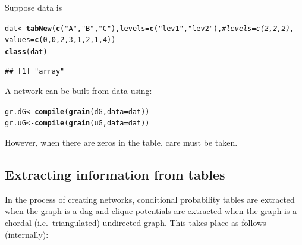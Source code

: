 \documentclass[10pt]{article}\usepackage[]{graphicx}\usepackage[]{xcolor}
\makeatletter
\newcommand{\hlnum}[1]{\textcolor[rgb]{0.686,0.059,0.569}{#1}}%
\newcommand{\hlstr}[1]{\textcolor[rgb]{0.192,0.494,0.8}{#1}}%
\newcommand{\hlcom}[1]{\textcolor[rgb]{0.678,0.584,0.686}{\textit{#1}}}%
\newcommand{\hlstd}[1]{\textcolor[rgb]{0.345,0.345,0.345}{#1}}%
\newcommand{\hlkwb}[1]{\textcolor[rgb]{0.69,0.353,0.396}{#1}}%
\newcommand{\hlkwc}[1]{\textcolor[rgb]{0.333,0.667,0.333}{#1}}%
\newcommand{\hlkwd}[1]{\textcolor[rgb]{0.737,0.353,0.396}{\textbf{#1}}}%
\newenvironment{kframe}{%
 \def\at@end@of@kframe{}%
 \ifinner\ifhmode%
  \def\at@end@of@kframe{\end{minipage}}%
  \begin{minipage}{\columnwidth}%
 \fi\fi%
 \def\FrameCommand##1{\hskip\@totalleftmargin \hskip-\fboxsep
 \colorbox{shadecolor}{##1}\hskip-\fboxsep
     \hskip-\linewidth \hskip-\@totalleftmargin \hskip\columnwidth}%
 \MakeFramed {\advance\hsize-\width
   \@totalleftmargin\z@ \linewidth\hsize
   \@setminipage}}%
 {\par\unskip\endMakeFramed%
 \at@end@of@kframe}
\newenvironment{knitrout}{}{} %
\makeatother
\begin{document}
Suppose data is
\begin{knitrout}
\color{fgcolor}\begin{kframe}
\begin{alltt}
\hlstd{dat} \hlkwb{<-} \hlkwd{tabNew}\hlstd{(}\hlkwd{c}\hlstd{(}\hlstr{"A"}\hlstd{,} \hlstr{"B"}\hlstd{,} \hlstr{"C"}\hlstd{),} \hlkwc{levels}\hlstd{=}\hlkwd{c}\hlstd{(}\hlstr{"lev1"}\hlstd{,} \hlstr{"lev2"}\hlstd{),} \hlcom{#levels=c(2,2,2),}
              \hlkwc{values}\hlstd{=}\hlkwd{c}\hlstd{(}\hlnum{0}\hlstd{,} \hlnum{0}\hlstd{,} \hlnum{2}\hlstd{,} \hlnum{3}\hlstd{,} \hlnum{1}\hlstd{,} \hlnum{2}\hlstd{,} \hlnum{1}\hlstd{,} \hlnum{4}\hlstd{))}
\hlkwd{class}\hlstd{(dat)}
\end{alltt}
\begin{verbatim}
## [1] "array"
\end{verbatim}
\end{kframe}
\end{knitrout}

A network can be built from data using:

\begin{knitrout}
\color{fgcolor}\begin{kframe}
\begin{alltt}
\hlstd{gr.dG} \hlkwb{<-} \hlkwd{compile}\hlstd{(}\hlkwd{grain}\hlstd{( dG,} \hlkwc{data}\hlstd{=dat ))}
\hlstd{gr.uG} \hlkwb{<-} \hlkwd{compile}\hlstd{(}\hlkwd{grain}\hlstd{( uG,} \hlkwc{data}\hlstd{=dat ))}
\end{alltt}
\end{kframe}
\end{knitrout}

However, when there are zeros in the table, care must be taken.

\subsection{Extracting information from tables}
\label{sec:extr-inform-from}

In the process of creating networks, conditional probability tables
are extracted when the graph is a dag and clique potentials are
extracted when the graph is a chordal (i.e.\ triangulated) undirected
graph. This takes place as follows (internally):
\end{document}
